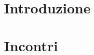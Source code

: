 \documentclass[a4paper, oneside, dvipsnames, table]{article}
\begin{document}
\copertina
\tableofcontents
\newpage 
\section{Introduzione}

\newpage
\section{Incontri}
    
\end{document}
